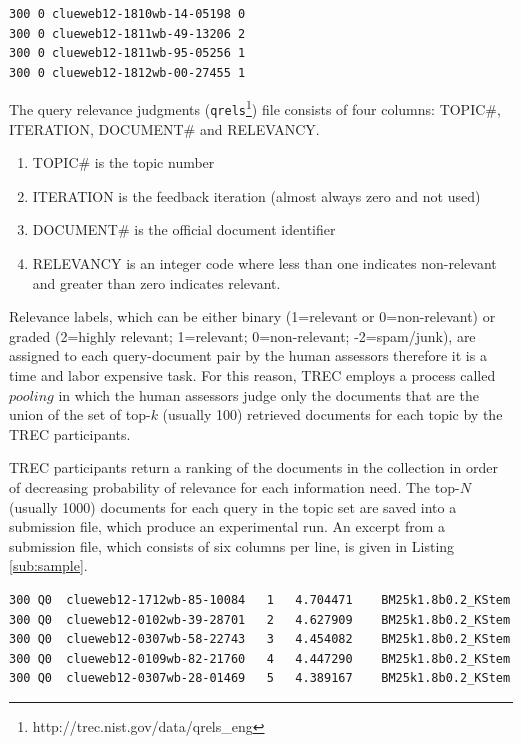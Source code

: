 \begin{lstlisting}
300 0 clueweb12-1810wb-14-05198 0
300 0 clueweb12-1811wb-49-13206 2
300 0 clueweb12-1811wb-95-05256 1
300 0 clueweb12-1812wb-00-27455 1
\end{lstlisting}


The query relevance judgments (\texttt{qrels}\footnote{http://trec.nist.gov/data/qrels\_eng}) file consists of four columns: TOPIC\#, ITERATION, DOCUMENT\# and RELEVANCY. 

\begin{enumerate}
\item TOPIC\# is the topic number
\item ITERATION is the feedback iteration (almost always zero and not used)
\item DOCUMENT\# is the official document identifier
\item RELEVANCY is an integer code where less than one indicates non-relevant and greater than zero indicates relevant.
\end{enumerate}

Relevance labels, which can be either binary (1=relevant or 0=non-relevant) or graded (2=highly relevant; 1=relevant; 0=non-relevant; -2=spam/junk), are assigned to each query-document pair by the human assessors therefore it is a time and labor expensive task.
For this reason, TREC employs a process called $pooling$ in which the human assessors judge only the documents that are the union of the set of top-$k$ (usually 100) retrieved documents for each topic by the TREC participants.

TREC participants return a ranking of the documents in the collection in order of decreasing probability of relevance for each information need.
The top-$N$ (usually 1000) documents for each query in the topic set are saved into a submission file, which produce an experimental run.
An excerpt from a submission file, which consists of six columns per line, is given in Listing \ref{sub:sample}.

\begin{lstlisting}
300	Q0	clueweb12-1712wb-85-10084	1	4.704471	BM25k1.8b0.2_KStem
300	Q0	clueweb12-0102wb-39-28701	2	4.627909	BM25k1.8b0.2_KStem
300	Q0	clueweb12-0307wb-58-22743	3	4.454082	BM25k1.8b0.2_KStem
300	Q0	clueweb12-0109wb-82-21760	4	4.447290	BM25k1.8b0.2_KStem
300	Q0	clueweb12-0307wb-28-01469	5	4.389167	BM25k1.8b0.2_KStem
\end{lstlisting}

